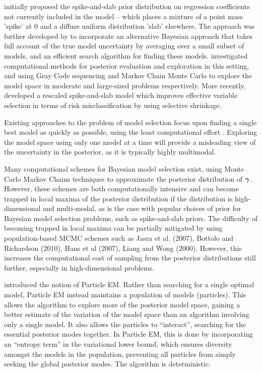 \cite{Mitchell1988} initially proposed the spike-and-slab prior distribution on
regression coefficients not currently included in the model -- which places a
mixture of a point mass 'spike' at $0$ and a diffuse uniform distribution
'slab' elsewhere. The approach was further developed by \cite{Madigan1994} to
incorporate an alternative Bayesian approach that takes full account of the
true model uncertainty by averaging over a small subset of models, and an
efficient search algorithm for finding these models. \cite{George1997}
investigated computational methods for posterior evaluation and exploration in
this setting, and using Gray Code sequencing and Markov Chain Monte Carlo to
explore the model space in moderate and large-sized problems respectively.
More recently, \cite{Ishwaran2005} developed a rescaled spike-and-slab model
which improves effective variable selection in terms of risk misclassification
by using selective shrinkage.


Existing approaches to the problem of model selection focus upon finding a
single best model as quickly as possible, using the least computational effort
\citep{You2014,Rockova2014}. Exploring the model space using only one
model at a time will provide a misleading view of the uncertainty in the
posterior, as it is typically highly multimodal.

Many computational schemes for Bayesian model selection exist, using Monte
Carlo Markov Chains techniques to approximate the posterior distribution of
${\boldsymbol \gamma}$. However, these schemes are both computationally intensive and can
become trapped in local maxima of the posterior distribution if the
distribution is high-dimensional and multi-modal, as is the case with popular
choices of prior for Bayesian model selection problems, such as spike-and-slab
priors. The difficulty of becoming trapped in local maxima can be partially
mitigated by using population-based MCMC schemes such as Jasra et al. (2007),
Bottolo and Richardson (2010), Hans et al (2007), Liang and Wong (2000).
However, this increases the computational cost of sampling from the posterior
distributions still further, especially in high-dimensional problems.

\cite{Rockova2017} introduced the notion of Particle EM. Rather than searching
for a single optimal model, Particle EM instead maintains a population of
models (particles). This allows the algorithm to explore more of the posterior
model space, gaining a better estimate of the variation of the model space than
an algorithm involving only a single model. It also allows the particles to
``interact'', searching for the essential posterior modes together. In Particle
EM, this is done by incorporating an ``entropy term'' in the variational lower
bound, which ensures diversity amongst the models in the population, preventing
all particles from simply seeking the global posterior modes. The algorithm is
deterministic.

